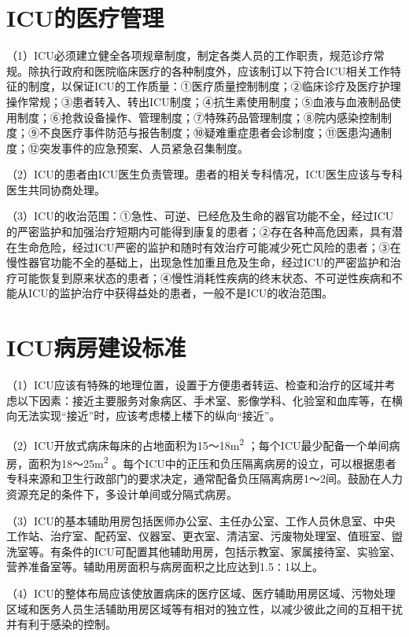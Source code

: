\section{ICU的医疗管理}

（1）ICU必须建立健全各项规章制度，制定各类人员的工作职责，规范诊疗常规。除执行政府和医院临床医疗的各种制度外，应该制订以下符合ICU相关工作特征的制度，以保证ICU的工作质量：①医疗质量控制制度；②临床诊疗及医疗护理操作常规；③患者转入、转出ICU制度；④抗生素使用制度；⑤血液与血液制品使用制度；⑥抢救设备操作、管理制度；⑦特殊药品管理制度；⑧院内感染控制制度；⑨不良医疗事件防范与报告制度；⑩疑难重症患者会诊制度；⑪医患沟通制度；⑫突发事件的应急预案、人员紧急召集制度。

（2）ICU的患者由ICU医生负责管理。患者的相关专科情况，ICU医生应该与专科医生共同协商处理。

（3）ICU的收治范围：①急性、可逆、已经危及生命的器官功能不全，经过ICU的严密监护和加强治疗短期内可能得到康复的患者；②存在各种高危因素，具有潜在生命危险，经过ICU严密的监护和随时有效治疗可能减少死亡风险的患者；③在慢性器官功能不全的基础上，出现急性加重且危及生命，经过ICU的严密监护和治疗可能恢复到原来状态的患者；④慢性消耗性疾病的终末状态、不可逆性疾病和不能从ICU的监护治疗中获得益处的患者，一般不是ICU的收治范围。

\section{ICU病房建设标准}

（1）ICU应该有特殊的地理位置，设置于方便患者转运、检查和治疗的区域并考虑以下因素：接近主要服务对象病区、手术室、影像学科、化验室和血库等，在横向无法实现“接近”时，应该考虑楼上楼下的纵向“接近”。

（2）ICU开放式病床每床的占地面积为15～18m\textsuperscript{2}
；每个ICU最少配备一个单间病房，面积为18～25m\textsuperscript{2}
。每个ICU中的正压和负压隔离病房的设立，可以根据患者专科来源和卫生行政部门的要求决定，通常配备负压隔离病房1～2间。鼓励在人力资源充足的条件下，多设计单间或分隔式病房。

（3）ICU的基本辅助用房包括医师办公室、主任办公室、工作人员休息室、中央工作站、治疗室、配药室、仪器室、更衣室、清洁室、污废物处理室、值班室、盥洗室等。有条件的ICU可配置其他辅助用房，包括示教室、家属接待室、实验室、营养准备室等。辅助用房面积与病房面积之比应达到1.5∶1以上。

（4）ICU的整体布局应该使放置病床的医疗区域、医疗辅助用房区域、污物处理区域和医务人员生活辅助用房区域等有相对的独立性，以减少彼此之间的互相干扰并有利于感染的控制。


